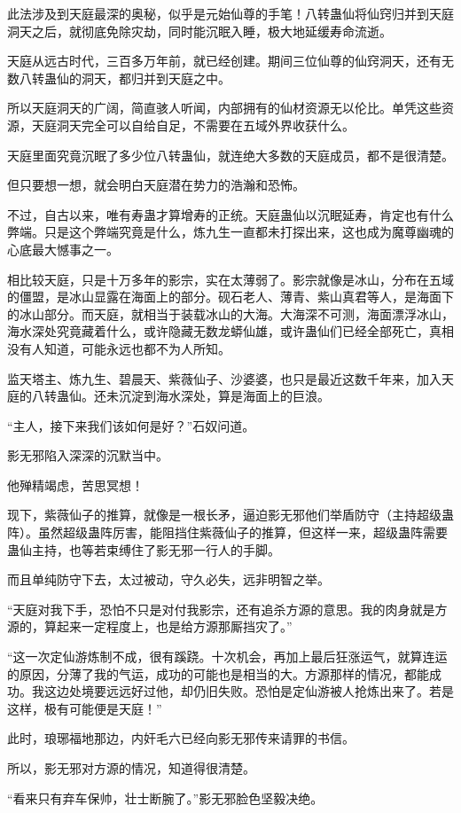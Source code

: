 \begin{this_body}
此法涉及到天庭最深的奥秘，似乎是元始仙尊的手笔！八转蛊仙将仙窍归并到天庭洞天之后，就彻底免除灾劫，同时能沉眠入睡，极大地延缓寿命流逝。

天庭从远古时代，三百多万年前，就已经创建。期间三位仙尊的仙窍洞天，还有无数八转蛊仙的洞天，都归并到天庭之中。

所以天庭洞天的广阔，简直骇人听闻，内部拥有的仙材资源无以伦比。单凭这些资源，天庭洞天完全可以自给自足，不需要在五域外界收获什么。

天庭里面究竟沉眠了多少位八转蛊仙，就连绝大多数的天庭成员，都不是很清楚。

但只要想一想，就会明白天庭潜在势力的浩瀚和恐怖。

不过，自古以来，唯有寿蛊才算增寿的正统。天庭蛊仙以沉眠延寿，肯定也有什么弊端。只是这个弊端究竟是什么，炼九生一直都未打探出来，这也成为魔尊幽魂的心底最大憾事之一。

相比较天庭，只是十万多年的影宗，实在太薄弱了。影宗就像是冰山，分布在五域的僵盟，是冰山显露在海面上的部分。砚石老人、薄青、紫山真君等人，是海面下的冰山部分。而天庭，就相当于装载冰山的大海。大海深不可测，海面漂浮冰山，海水深处究竟藏着什么，或许隐藏无数龙蟒仙雄，或许蛊仙们已经全部死亡，真相没有人知道，可能永远也都不为人所知。

监天塔主、炼九生、碧晨天、紫薇仙子、沙婆婆，也只是最近这数千年来，加入天庭的八转蛊仙。还未沉淀到海水深处，算是海面上的巨浪。

“主人，接下来我们该如何是好？”石奴问道。

影无邪陷入深深的沉默当中。

他殚精竭虑，苦思冥想！

现下，紫薇仙子的推算，就像是一根长矛，逼迫影无邪他们举盾防守（主持超级蛊阵）。虽然超级蛊阵厉害，能阻挡住紫薇仙子的推算，但这样一来，超级蛊阵需要蛊仙主持，也等若束缚住了影无邪一行人的手脚。

而且单纯防守下去，太过被动，守久必失，远非明智之举。

“天庭对我下手，恐怕不只是对付我影宗，还有追杀方源的意思。我的肉身就是方源的，算起来一定程度上，也是给方源那厮挡灾了。”

“这一次定仙游炼制不成，很有蹊跷。十次机会，再加上最后狂涨运气，就算连运的原因，分薄了我的气运，成功的可能也是相当的大。方源那样的情况，都能成功。我这边处境要远远好过他，却仍旧失败。恐怕是定仙游被人抢炼出来了。若是这样，极有可能便是天庭！”

此时，琅琊福地那边，内奸毛六已经向影无邪传来请罪的书信。

所以，影无邪对方源的情况，知道得很清楚。

“看来只有弃车保帅，壮士断腕了。”影无邪脸色坚毅决绝。


\end{this_body}
